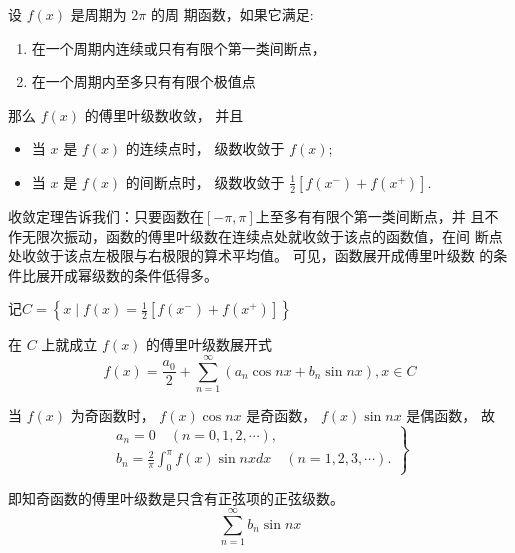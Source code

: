 \begin{theorem}
    设 $ f(x) $ 是周期为 $ 2 \pi $ 的周 期函数，如果它满足:

    \begin{enumerate}
        \item 在一个周期内连续或只有有限个第一类间断点，
        \item 在一个周期内至多只有有限个极值点
    \end{enumerate}

    那么 $ f(x) $ 的傅里叶级数收敛， 并且

    \begin{itemize}
    \item 当 $ x $ 是 $ f(x) $ 的连续点时， 级数收敛于 $ f(x) $;
    \item 当 $ x $ 是 $ f(x) $ 的间断点时， 级数收敛于 $ \frac{1}{2}\left[f\left(x^{-}\right)+f\left(x^{+}\right)\right] $.
    \end{itemize}
\end{theorem}

收敛定理告诉我们：只要函数在$[-\pi,\pi]$上至多有有限个第一类间断点，并
且不作无限次振动，函数的傅里叶级数在连续点处就收敛于该点的函数值，在间
断点处收敛于该点左极限与右极限的算术平均值。 可见，函数展开成傅里叶级数
的条件比展开成幂级数的条件低得多。 

\begin{corollary}
    记$
C=\left\{x \mid f(x)=\frac{1}{2}\left[f\left(x^{-}\right)+f\left(x^{+}\right)\right]\right\}
$

在 $ C $ 上就成立 $ f(x) $ 的傅里叶级数展开式
\begin{equation}
f(x)=\frac{a_{0}}{2}+\sum_{n=1}^{\infty}\left(a_{n} \cos n x+b_{n} \sin n x\right), x \in C
\end{equation}
\end{corollary}

\begin{definition}[正弦级数]
    当 $ f(x) $ 为奇函数时， $ f(x) \cos n x $ 是奇函数， $ f(x) \sin n x $ 是偶函数， 故
\begin{equation}
\left.\begin{array}{l}
a_{n}=0 \quad(n=0,1,2, \cdots), \\
b_{n}=\frac{2}{\pi} \int_{0}^{\pi} f(x) \sin n x {d} x \quad(n=1,2,3, \cdots) .
\end{array}\right\}
\end{equation}

即知奇函数的傅里叶级数是只含有正弦项的正弦级数。
\begin{equation} \sum_{n=1}^{\infty} b_{n} \sin n x \end{equation}
\end{definition}

